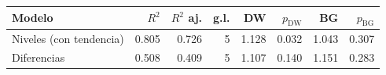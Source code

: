 
\begin{tabular}{lrrrrrrr}
\toprule
Modelo & $R^2$ & $R^2$ aj. & g.l. & DW & $p_{\text{DW}}$ & BG & $p_{\text{BG}}$\\
\midrule
Niveles (con tendencia) & 0.805 & 0.726 & 5 & 1.128 & 0.032 & 1.043 & 0.307\\
Diferencias & 0.508 & 0.409 & 5 & 1.107 & 0.140 & 1.151 & 0.283\\
\bottomrule
\end{tabular}
